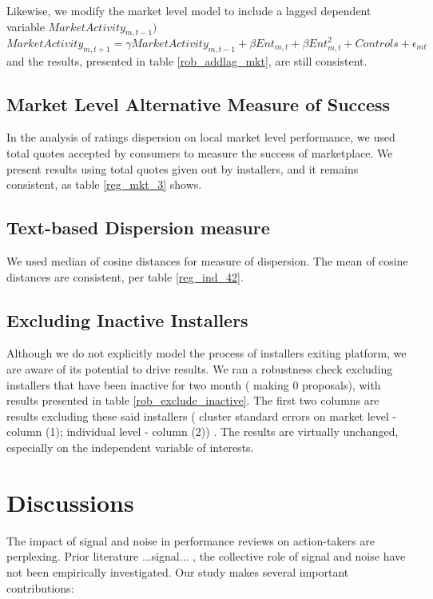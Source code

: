 \documentclass[msom,blindrev]{informs3}
\begin{document}
Likewise, we modify the market level model to include a lagged dependent variable $MarketActivity_{m,t-1})$
\begin{equation}
    MarketActivity_{m,t+1}=\gamma MarketActivity_{m,t-1}+\beta Ent_{m,t}+\beta Ent_{m,t}^2+Controls+\epsilon_{mt}
\end{equation}
and the results, presented in table \ref{rob_addlag_mkt}, are still consistent.




\subsection{Market Level Alternative Measure of Success}

In the analysis of ratings dispersion on local market level performance, we used total quotes accepted by consumers to measure the success of marketplace. We present results using total quotes given out by installers, and it remains consistent, as table \ref{reg_mkt_3} shows. 

\subsection{Text-based Dispersion measure}

We used median of cosine distances for measure of dispersion. The mean of cosine distances are consistent, per table \ref{reg_ind_42}. 
\subsection{Excluding Inactive Installers}
Although we do not explicitly model the process of installers exiting platform, we are aware of its potential to drive results. We ran a robustness check excluding installers that have been inactive for two month ( making 0 proposals), with results presented in table \ref{rob_exclude_inactive}. The first two columns are results excluding these said installers ( cluster standard errors on market level - column (1); individual level - column (2)) . The results are virtually unchanged, especially on the independent variable of interests.


\section{Discussions}
The impact of signal and noise in performance reviews on action-takers are perplexing. Prior literature ...signal... , the collective role of signal and noise have not been empirically investigated. Our study makes several important contributions: 
\end{document}
